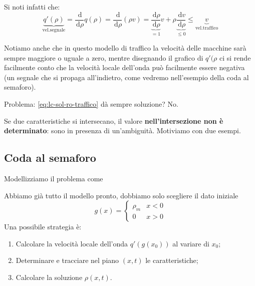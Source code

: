 \documentclass[10pt,a4paper,twoside,openright]{book}
\newcommand{\de}{\,\mathrm d}
\newcommand{\drho}{\de \rho}
\begin{document}
Si noti infatti che:
\begin{equation*}
    \underbrace{q'(\rho)}_{\text{vel.segnale}} = \frac{\de}{\drho}q(\rho) = \frac{\de}{\drho}(\rho v) = \underbrace{\frac{\drho }{\drho }}_{=1}v + \rho \underbrace{\frac{\de v}{\drho}}_{\le 0} \le \underbrace{v}_{\text{vel.traffico}}
\end{equation*}

Notiamo anche che in questo modello di traffico la velocità delle macchine sarà sempre maggiore o uguale a zero, mentre disegnando il grafico di $q'(\rho $ ci si rende facilmente conto che la velocità locale dell'onda può facilmente essere negativa (un segnale che si propaga all'indietro, come vedremo nell'esempio della coda al semaforo).

Problema: \eqref{eq:lc-sol-ro-traffico} dà sempre soluzione? No.


Se due caratteristiche si intersecano, il valore \textbf{nell'intersezione non è determinato}: sono in presenza di un'ambiguità. Motiviamo con due esempi.
\subsection{Coda al semaforo}

Modellizziamo il problema come

Abbiamo già tutto il modello pronto, dobbiamo solo scegliere il dato iniziale
\begin{equation}
    g(x) =
    \begin{cases}
        \rho _{m} & x< 0 \\
        0         & x >0
    \end{cases}
\end{equation}
Una possibile strategia è:
\begin{enumerate}
    \item Calcolare la velocità locale dell'onda $q'(g(x_{0}))$ al variare di $x_{0}$;
    \item Determinare e tracciare nel piano $(x,t)$ le caratteristiche;
    \item Calcolare la soluzione $\rho (x,t)$.
\end{enumerate}
\end{document}
